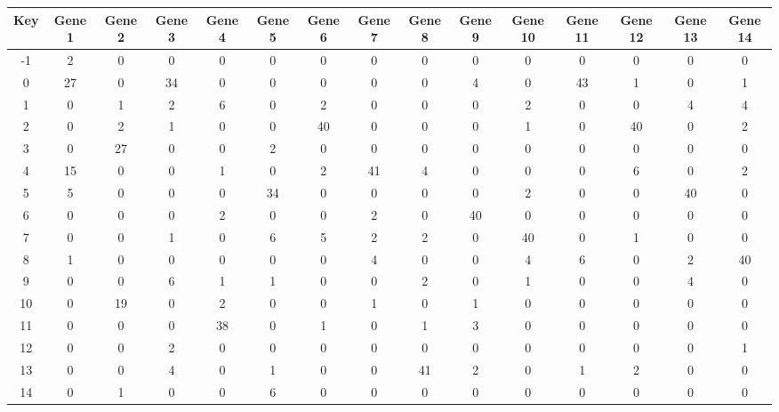 \begin{tabular}{|c|c|c|c|c|c|c|c|c|c|c|c|c|c|c|}
\hline
Key & Gene 1 & Gene 2 & Gene 3 & Gene 4 & Gene 5 & Gene 6 & Gene 7 & Gene 8 & Gene 9 & Gene 10 & Gene 11 & Gene 12 & Gene 13 & Gene 14 \\
\hline
-1 & 2 & 0 & 0 & 0 & 0 & 0 & 0 & 0 & 0 & 0 & 0 & 0 & 0 & 0 \\
0 & 27 & 0 & 34 & 0 & 0 & 0 & 0 & 0 & 4 & 0 & 43 & 1 & 0 & 1 \\
1 & 0 & 1 & 2 & 6 & 0 & 2 & 0 & 0 & 0 & 2 & 0 & 0 & 4 & 4 \\
2 & 0 & 2 & 1 & 0 & 0 & 40 & 0 & 0 & 0 & 1 & 0 & 40 & 0 & 2 \\
3 & 0 & 27 & 0 & 0 & 2 & 0 & 0 & 0 & 0 & 0 & 0 & 0 & 0 & 0 \\
4 & 15 & 0 & 0 & 1 & 0 & 2 & 41 & 4 & 0 & 0 & 0 & 6 & 0 & 2 \\
5 & 5 & 0 & 0 & 0 & 34 & 0 & 0 & 0 & 0 & 2 & 0 & 0 & 40 & 0 \\
6 & 0 & 0 & 0 & 2 & 0 & 0 & 2 & 0 & 40 & 0 & 0 & 0 & 0 & 0 \\
7 & 0 & 0 & 1 & 0 & 6 & 5 & 2 & 2 & 0 & 40 & 0 & 1 & 0 & 0 \\
8 & 1 & 0 & 0 & 0 & 0 & 0 & 4 & 0 & 0 & 4 & 6 & 0 & 2 & 40 \\
9 & 0 & 0 & 6 & 1 & 1 & 0 & 0 & 2 & 0 & 1 & 0 & 0 & 4 & 0 \\
10 & 0 & 19 & 0 & 2 & 0 & 0 & 1 & 0 & 1 & 0 & 0 & 0 & 0 & 0 \\
11 & 0 & 0 & 0 & 38 & 0 & 1 & 0 & 1 & 3 & 0 & 0 & 0 & 0 & 0 \\
12 & 0 & 0 & 2 & 0 & 0 & 0 & 0 & 0 & 0 & 0 & 0 & 0 & 0 & 1 \\
13 & 0 & 0 & 4 & 0 & 1 & 0 & 0 & 41 & 2 & 0 & 1 & 2 & 0 & 0 \\
14 & 0 & 1 & 0 & 0 & 6 & 0 & 0 & 0 & 0 & 0 & 0 & 0 & 0 & 0 \\
\hline
\end{tabular}